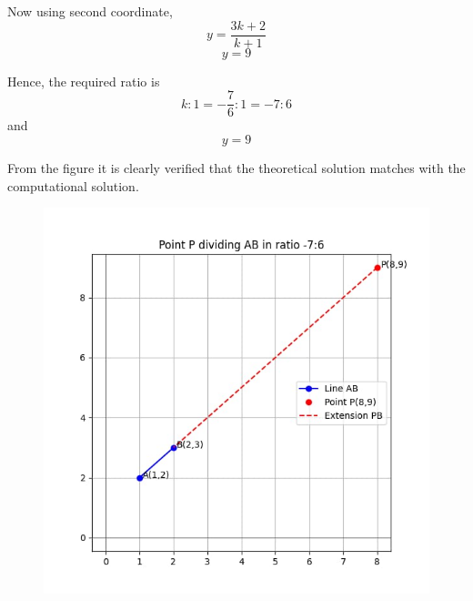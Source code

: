 \documentclass[journal]{IEEEtran}
\begin{document}
Now using second coordinate,
\begin{equation}
y = \frac{3k+2}{k+1}
\end{equation}
\begin{equation}
y = 9
\end{equation}

Hence, the required ratio is 
\[
k:1 = -\frac{7}{6}:1 = -7:6
\]
and 
\[
y = 9
\]

From the figure it is clearly verified that the theoretical solution matches with the computational solution.

\begin{figure}
    \centering
    \includegraphics[width=1\columnwidth]{figs/fig1.jpg}
    \caption{}
    \label{fig:placeholder}
\end{figure}
\end{document}
